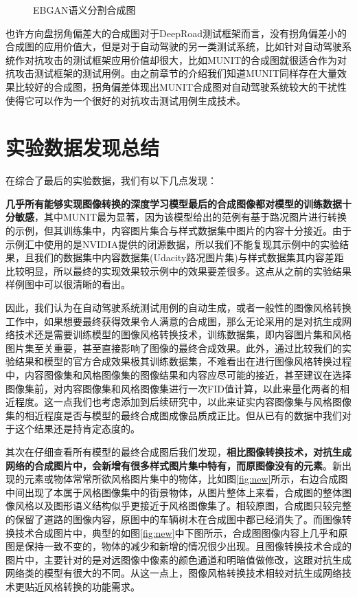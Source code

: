 \begin{figure}[h]
    \centering
    \caption{EBGAN语义分割合成图}
    \label{fig:seg}
\end{figure}

也许方向盘拐角偏差大的合成图对于DeepRoad测试框架而言，没有拐角偏差小的合成图的应用价值大，但是对于自动驾驶的另一类测试系统，比如针对自动驾驶系统作对抗攻击的测试框架应用价值却很大，比如MUNIT的合成图就很适合作为对抗攻击测试框架的测试用例。由之前章节的介绍我们知道MUNIT同样存在大量效果比较好的合成图，拐角偏差体现出MUNIT合成图对自动驾驶系统较大的干扰性使得它可以作为一个很好的对抗攻击测试用例生成技术。

\section{实验数据发现总结}

在综合了最后的实验数据，我们有以下几点发现：

\textbf{几乎所有能够实现图像转换的深度学习模型最后的合成图像都对模型的训练数据十分敏感}，其中MUNIT最为显著，因为该模型给出的范例有基于路况图片进行转换的示例，但其训练集中，内容图片集合与样式数据集中图片的内容十分接近。由于示例汇中使用的是NVIDIA提供的闭源数据，所以我们不能复现其示例中的实验结果，且我们的数据集中内容数据集(Udacity路况图片集)与样式数据集其内容差距比较明显，所以最终的实现效果较示例中的效果要差很多。这点从之前的实验结果样例图中可以很清晰的看出。

因此，我们认为在自动驾驶系统测试用例的自动生成，或者一般性的图像风格转换工作中，如果想要最终获得效果令人满意的合成图，那么无论采用的是对抗生成网络技术还是需要训练模型的图像风格转换技术，训练数据集，即内容图片集和风格图片集至关重要，甚至直接影响了图像的最终合成效果。此外，通过比较我们的实验结果和模型的官方合成效果极其训练数据集，不难看出在进行图像风格转换过程中，内容图像集和风格图像集的图像结果和内容应尽可能的接近，甚至建议在选择图像集前，对内容图像集和风格图像集进行一次FID值计算，以此来量化两者的相近程度。这一点我们也考虑添加到后续研究中，以此来证实内容图像集与风格图像集的相近程度是否与模型的最终合成图成像品质成正比。但从已有的数据中我们对于这个结果还是持肯定态度的。

其次在仔细查看所有模型的最终合成图后我们发现，\textbf{相比图像转换技术，对抗生成网络的合成图片中，会新增有很多样式图片集中特有，而原图像没有的元素}。新出现的元素或物体常常所欲风格图片集中的物体，比如图\ref{fig:new}所示，右边合成图中间出现了本属于风格图像集中的街景物体，从图片整体上来看，合成图的整体图像风格以及图形语义结构似乎更接近于风格图像集了。相较原图，合成图只较完整的保留了道路的图像内容，原图中的车辆树木在合成图中都已经消失了。而图像转换技术合成图片中，典型的如图\ref{fig:new}中下图所示，合成图图像内容上几乎和原图是保持一致不变的，物体的减少和新增的情况很少出现。且图像转换技术合成的图片中，主要针对的是对远图像中像素的颜色通道和明暗值做修改，这跟对抗生成网络类的模型有很大的不同。从这一点上，图像风格转换技术相较对抗生成网络技术更贴近风格转换的功能需求。

